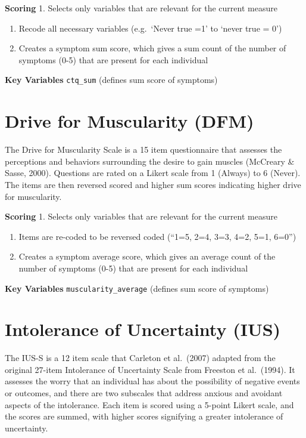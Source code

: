 \documentclass[
]{book}
\begin{document}
\textbf{Scoring} 1. Selects only variables that are relevant for the current
measure

\begin{enumerate}
\def\labelenumi{\arabic{enumi}.}
\setcounter{enumi}{1}
\item
  Recode all necessary variables (e.g.~`Never true =1' to `never true
  = 0')
\item
  Creates a symptom sum score, which gives a sum count of the number
  of symptoms (0-5) that are present for each individual
\end{enumerate}

\textbf{Key Variables} \texttt{ctq\_sum} (defines sum score of symptoms)

\section{Drive for Muscularity (DFM)}\label{drive-for-muscularity-dfm}

The Drive for Muscularity Scale is a 15 item questionnaire that assesses
the perceptions and behaviors surrounding the desire to gain muscles
(McCreary \& Sasse, 2000). Questions are rated on a Likert scale from 1
(Always) to 6 (Never). The items are then reversed scored and higher sum
scores indicating higher drive for muscularity.

\textbf{Scoring} 1. Selects only variables that are relevant for the current
measure

\begin{enumerate}
\def\labelenumi{\arabic{enumi}.}
\setcounter{enumi}{1}
\item
  Items are re-coded to be reversed coded (``1=5, 2=4, 3=3, 4=2, 5=1,
  6=0'')
\item
  Creates a symptom average score, which gives an average count of the
  number of symptoms (0-5) that are present for each individual
\end{enumerate}

\textbf{Key Variables} \texttt{muscularity\_average} (defines sum score of symptoms)

\section{Intolerance of Uncertainty (IUS)}\label{intolerance-of-uncertainty-ius}

The IUS-S is a 12 item scale that Carleton et al.~(2007) adapted from
the original 27-item Intolerance of Uncertainty Scale from Freeston et
al.~(1994). It assesses the worry that an individual has about the
possibility of negative events or outcomes, and there are two subscales
that address anxious and avoidant aspects of the intolerance. Each item
is scored using a 5-point Likert scale, and the scores are summed, with
higher scores signifying a greater intolerance of uncertainty.
\end{document}
